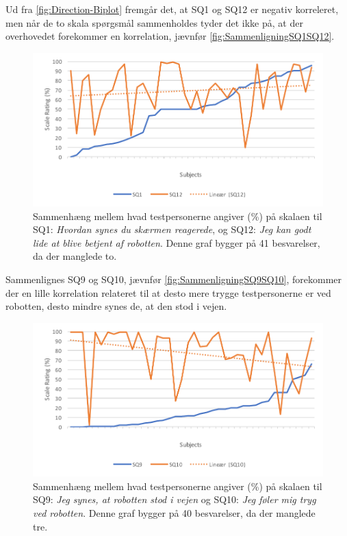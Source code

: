 Ud fra \autoref{fig:Direction-Biplot} fremgår det, at SQ1 og SQ12 er negativ korreleret, men når de to skala spørgsmål sammenholdes tyder det ikke på, at der overhovedet forekommer en korrelation, jævnfør \autoref{fig:SammenligningSQ1SQ12}.  
%
\begin{figure}[H]
	\centering
	\includegraphics[width=\textwidth]{Figure/Korrelationsgrafer/SQ1+SQ12}
	\caption{Sammenhæng mellem hvad testpersonerne angiver (\%) på skalaen til SQ1: \textit{Hvordan synes du skærmen reagerede}, og SQ12: \textit{Jeg kan godt lide at blive betjent af robotten}. Denne graf bygger på 41 besvarelser, da der manglede to.}
	\label{fig:SammenligningSQ1SQ12}
\end{figure}
\noindent
%
Sammenlignes SQ9 og SQ10, jævnfør \autoref{fig:SammenligningSQ9SQ10}, forekommer der en lille korrelation relateret til at desto mere trygge testpersonerne er ved robotten, desto mindre synes de, at den stod i vejen. 
%
\begin{figure}[H]
	\centering
	\includegraphics[width=\textwidth]{Figure/Korrelationsgrafer/SQ9+SQ10}
	\caption{Sammenhæng mellem hvad testpersonerne angiver (\%) på skalaen til SQ9: \textit{Jeg synes, at robotten stod i vejen} og SQ10: \textit{Jeg føler mig tryg ved robotten}. Denne graf bygger på 40 besvarelser, da der manglede tre.}
	\label{fig:SammenligningSQ9SQ10}
\end{figure}
